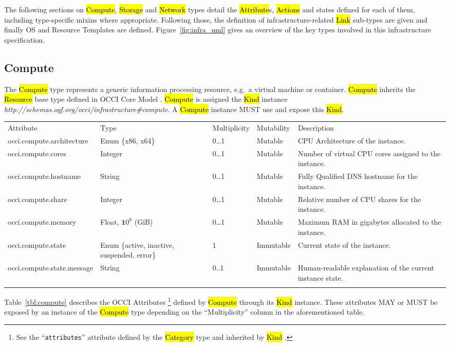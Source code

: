 \documentclass[10pt,a4paper]{article}
\begin{document}
The following sections on \hl{Compute}, \hl{Storage} and \hl{Network}
types detail the \hl{Attribute}s, \hl{Actions} and states defined for
each of them, including type-specific mixins where appropriate.
Following those, the definition of infrastructure-related \hl{Link}
sub-types are given and finally OS and Resource Templates
are defined. Figure~\ref{fig:infra_uml} gives an overview of
the key types involved in this infrastructure specification.

\subsection{Compute}
The \hl{Compute} type represents a generic information processing
resource, e.g.~a virtual machine or container. \hl{Compute} inherits
the \hl{Resource} base type defined in OCCI Core Model
\cite{occi:core}.  \hl{Compute} is assigned the \hl{Kind} instance
\textit{http://schemas.ogf.org/occi/infrastructure\#compute}.  A
\hl{Compute} instance MUST use and expose this \hl{Kind}.

{
	\begin{tabular}{lp{2.5cm}p{1cm}lp{5cm}}
	\toprule
	Attribute&Type&Multi\-plicity&Mutability&Description\\
	\colrule
	occi.compute.architecture & Enum \{x86, x64\} & 0\ldots1
	& Mutable & CPU Architecture of the instance.\\
	occi.compute.cores & Integer & 0\ldots1
	& Mutable & Number of virtual CPU cores assigned to the instance.\\
	occi.compute.hostname & String & 0\ldots1
	& Mutable & Fully Qualified DNS hostname for the instance.\\
	occi.compute.share & Integer & 0\ldots1
	& Mutable & Relative number of CPU shares for the instance.\\
	occi.compute.memory & Float, ${\mathbf 10}^9$ (GiB) & 0\ldots1
	& Mutable & Maximum RAM in gigabytes allocated to the instance.\\
	occi.compute.state & Enum \{active, inactive, suspended, error\} & 1
	& Immutable & Current state of the instance.\\
	occi.compute.state.message & String & 0..1
	& Immutable & Human-readable explanation of the current instance state.\\
	\botrule
	\end{tabular}
}

Table~\ref{tbl:compute} describes the OCCI Attributes%
\footnote{See the ``{\tt attributes}'' attribute defined by the
  \hl{Category} type and inherited by \hl{Kind} \cite{occi:core}.}
defined by \hl{Compute} through its \hl{Kind} instance. These attributes
MAY or MUST be exposed by an instance of the \hl{Compute} type
depending on the ``Multiplicity'' column in the aforementioned table.
\end{document}
